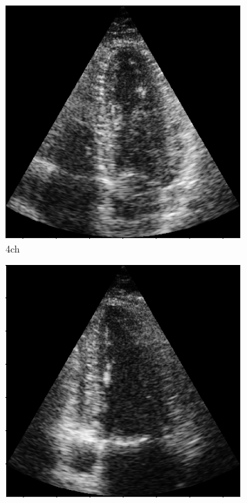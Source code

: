 \begin{figure}[H]
    \centering
    \begin{subfigure}[b]{0.3\textwidth} 
        \includegraphics[width=0.99\textwidth]{echocardiography/4ch_frame.png}
        \caption{\acrshort{4ch}}
        \label{fig:us_view_examples_4ch}
    \end{subfigure}
    \begin{subfigure}[b]{0.3\textwidth}
        \includegraphics[width=0.99\textwidth]{echocardiography/2ch_frame.png}

\end{subfigure}
\end{figure}
